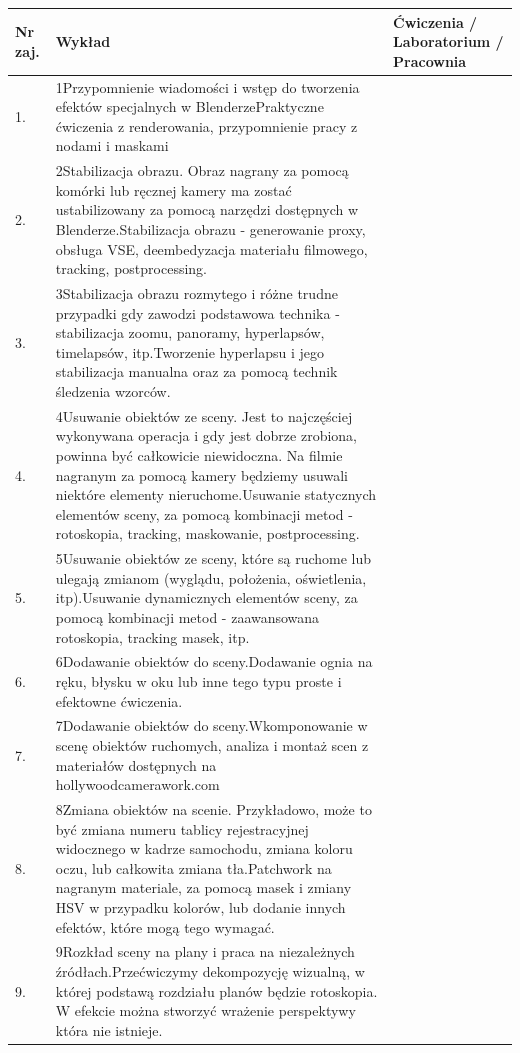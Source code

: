 \documentclass[12pt, a4paper]{article}
\begin{document}
\begin{longtable}{|p{1.5cm}|p{6.5cm}|p{6.5cm}|}
\hline
\textbf{Nr zaj.} & \textbf{Wykład} & \textbf{Ćwiczenia / Laboratorium / Pracownia} \\\hline
\endhead
  \hline
  1. & 1Przypomnienie wiadomości i wstęp do tworzenia efektów specjalnych w BlenderzePraktyczne ćwiczenia z renderowania, przypomnienie pracy z nodami i maskami &  \\
  \hline
  2. & 2Stabilizacja obrazu. Obraz nagrany za pomocą komórki lub ręcznej kamery ma zostać ustabilizowany za pomocą narzędzi dostępnych w Blenderze.Stabilizacja obrazu - generowanie proxy, obsługa VSE, deembedyzacja materiału filmowego, tracking, postprocessing. &  \\
  \hline
  3. & 3Stabilizacja obrazu rozmytego i różne trudne przypadki gdy zawodzi podstawowa technika - stabilizacja zoomu, panoramy, hyperlapsów, timelapsów, itp.Tworzenie hyperlapsu i jego stabilizacja manualna oraz za pomocą technik śledzenia wzorców. &  \\
  \hline
  4. & 4Usuwanie obiektów ze sceny. Jest to najczęściej wykonywana operacja i gdy jest dobrze zrobiona, powinna być całkowicie niewidoczna. Na filmie nagranym za pomocą kamery będziemy usuwali niektóre elementy nieruchome.Usuwanie statycznych elementów sceny, za pomocą kombinacji metod - rotoskopia, tracking, maskowanie, postprocessing. &  \\
  \hline
  5. & 5Usuwanie obiektów ze sceny, które są ruchome lub ulegają zmianom (wyglądu, położenia, oświetlenia, itp).Usuwanie dynamicznych elementów sceny, za pomocą kombinacji metod - zaawansowana rotoskopia, tracking masek, itp. &  \\
  \hline
  6. & 6Dodawanie obiektów do sceny.Dodawanie ognia na ręku, błysku w oku lub inne tego typu proste i efektowne ćwiczenia. &  \\
  \hline
  7. & 7Dodawanie obiektów do sceny.Wkomponowanie w scenę obiektów ruchomych, analiza i montaż scen z materiałów dostępnych na hollywoodcamerawork.com &  \\
  \hline
  8. & 8Zmiana obiektów na scenie. Przykładowo, może to być zmiana numeru tablicy rejestracyjnej widocznego w kadrze samochodu, zmiana koloru oczu, lub całkowita zmiana tła.Patchwork na nagranym materiale, za pomocą masek i zmiany HSV w przypadku kolorów, lub dodanie innych efektów, które mogą tego wymagać. &  \\
  \hline
  9. & 9Rozkład sceny na plany i praca na niezależnych źródłach.Przećwiczymy dekompozycję wizualną, w której podstawą rozdziału planów będzie rotoskopia. W efekcie można stworzyć wrażenie perspektywy która nie istnieje. &  \\

\end{longtable}
\end{document}
